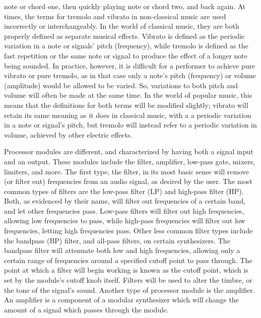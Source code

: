note or chord one, then quickly playing note or chord two, and back again. At times, the terms for tremolo and vibrato in non-classical music are used incorrectly or interchangeably. In the world of classical music, they are both properly defined as separate musical effects. Vibrato is defined as the periodic variation in a note or signals' pitch (frequency), while tremolo is defined as the fast repetition or the same note or signal to produce the effect of a longer note being sounded. In practice, however, it is difficult for a performer to achieve pure vibrato or pure tremolo, as in that case only a note's pitch (frequency) or volume (amplitude) would be allowed to be varied. So, variations to both pitch and volume will often be made at the same time. In the world of popular music, this means that the definitions for both terms will be modified slightly; vibrato will retain its same meaning as it does in classical music, with a a periodic variation in a note or signal's pitch, but tremolo will instead refer to a periodic variation in volume, achieved by other electric effects.

Processor modules are different, and characterized by having both a signal input and an output. These modules include the filter, amplifier, low-pass gate, mixers, limiters, and more. The first type, the filter, in its most basic sense will remove (or filter out) frequencies from an audio signal, as desired by the user. The most common types of filters are the low-pass filter (LP) and high-pass filter (HP). Both, as evidenced by their name, will filter out frequencies of a certain band, and let other frequencies pass. Low-pass filters will filter out high frequencies, allowing low frequencies to pass, while high-pass frequencies will filter out low frequencies, letting high frequencies pass\cite{Winer_2018}. Other less common filter types include the bandpass (BP) filter, and all-pass filters, on certain synthesizers. The bandpass filter will attenuate both low and high frequencies, allowing only a certain range of frequencies around a specified cutoff point to pass through. The point at which a filter will begin working is known as the cutoff point, which is set by the module's cutoff knob itself. Filters will be used to alter the timbre, or the tone of the signal's sound. Another type of processor module is the amplifier. An amplifier is a component of a modular synthesizer which will change the amount of a signal which passes through the module. 

